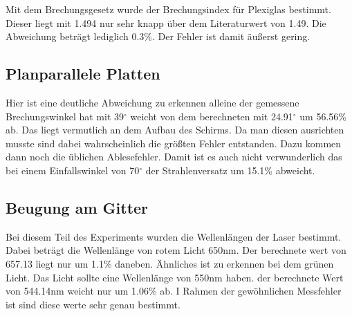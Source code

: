 Mit dem Brechungsgesetz wurde der Brechungsindex für Plexiglas bestimmt. Dieser liegt mit 1.494 nur sehr knapp über dem Literaturwert von 1.49. Die Abweichung beträgt lediglich 0.3\%. Der Fehler ist damit äußerst gering.

\subsection{Planparallele Platten}

Hier ist eine deutliche Abweichung zu erkennen alleine der gemessene Brechungswinkel hat mit 39$^\circ$ weicht von dem berechneten mit 24.91$^\circ$ um 56.56\% ab. Das liegt vermutlich an dem Aufbau des Schirms. Da man diesen ausrichten musste sind dabei wahrscheinlich die größten Fehler entstanden. Dazu kommen dann noch die üblichen Ablesefehler. Damit ist es auch nicht verwunderlich das bei einem Einfallswinkel von 70$^\circ$ der Strahlenversatz um 15.1\% abweicht.

\subsection{Beugung am Gitter}

Bei diesem Teil des Experiments wurden die  Wellenlängen der Laser bestimmt. Dabei beträgt die Wellenlänge von rotem Licht 650nm. Der berechnete wert von 657.13 liegt nur um 1.1\% daneben. Ähnliches ist zu erkennen bei dem grünen Licht. Das Licht sollte eine Wellenlänge von 550nm haben. der berechnete Wert von 544.14nm weicht  nur um 1.06\% ab. I Rahmen der gewöhnlichen Messfehler ist sind diese werte sehr genau bestimmt.
